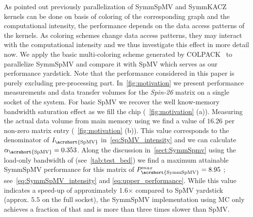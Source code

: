 
As pointed out previously parallelization of \acrshort{SymmSpMV} and \acrshort{SymmKACZ} kernels can be done on basis of \DTWO coloring of the corresponding graph and the computational intensity, \ie the performance depends on the data access patterns of the kernels. As coloring schemes change data access patterns, they may interact with the computational intensity and we thus investigate this effect in more detail now. We apply  the basic multi-coloring scheme generated by COLPACK~\cite{COLPACK} to parallelize \acrshort{SymmSpMV} and compare it with \acrshort{SpMV} which serves as our performance yardstick. Note that the performance considered in this paper is purely excluding pre-processing part. In~\cref{fig:motivation} we present performance measurements and data transfer volumes for the \emph{Spin-26} matrix on a single socket of the \IVB system. For basic \acrshort{SpMV} we recover the well know-memory bandwidth saturation effect as we fill the chip (~\cref{fig:motivation} (a)). Measuring the actual data volume from main memory using \LIKWID we find a value of $16.26$ \BYTE per non-zero matrix entry (~\cref{fig:motivation} (b)). This value corresponds to the denominator of $I_\mathrm{\acrshort{SpMV}}$ in~\cref{eq:SpMV_intensity} and we can calculate $\alpha_\mathrm{\acrshort{SpMV}}=0.353$. Along the discussion in~\cref{sect:SymmSpmv} using the load-only bandwidth of \IVB (see~\cref{tab:test_bed}) we find a maximum attainable {\acrshort{SymmSpMV}} performance for this matrix of $P^{max}_\mathrm{\acrshort{SymmSpMV}}=8.95$ \GF; see~\cref{eq:SymmSpMV_intensity} and \cref{eq:upper_performance}. While this value indicates a speed-up of approximately 1.6$\times$ compared to \acrshort{SpMV} yardstick (approx. $5.5$ \GF on the full socket), the \acrshort{SymmSpMV} implementation using \acrfull{MC} only achieves a fraction of that and is more than three times slower than \acrshort{SpMV}. 




